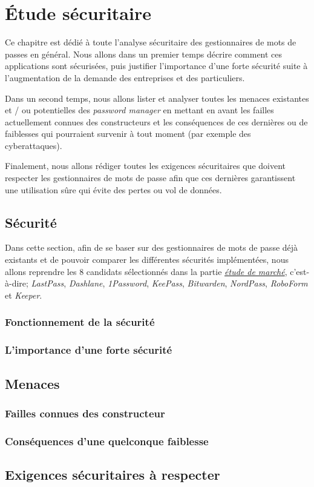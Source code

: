 

\chapter{Étude sécuritaire}
\label{ch:etude_secu}

Ce chapitre est dédié à toute l'analyse sécuritaire des gestionnaires de mots de passes en général. Nous allons dans un premier temps décrire comment ces applications sont sécurisées, puis justifier l'importance d'une forte sécurité suite à l'augmentation de la demande des entreprises et des particuliers.

Dans un second temps, nous allons lister et analyser toutes les menaces existantes et / ou potentielles des \textit{password manager} en mettant en avant les failles actuellement connues des constructeurs et les conséquences de ces dernières ou de faiblesses qui pourraient survenir à tout moment (par exemple des cyberattaques).

Finalement, nous allons rédiger toutes les exigences sécuritaires que doivent respecter les gestionnaires de mots de passe afin que ces dernières garantissent une utilisation sûre qui évite des pertes ou vol de données.

\section{Sécurité}

Dans cette section, afin de se baser sur des gestionnaires de mots de passe déjà existants et de pouvoir comparer les différentes sécurités implémentées, nous allons reprendre les 8 candidats sélectionnés dans la partie \hyperref[ch:etude_marche]{\textit{étude de marché}}, c'est-à-dire; \textit{LastPass}, \textit{Dashlane}, \textit{1Password}, \textit{KeePass}, \textit{Bitwarden}, \textit{NordPass}, \textit{RoboForm} et \textit{Keeper}.
\subsection{Fonctionnement de la sécurité}
\subsection{L'importance d'une forte sécurité}
\section{Menaces}
\subsection{Failles connues des constructeur}
\subsection{Conséquences d'une quelconque faiblesse}
\section{Exigences sécuritaires à respecter}